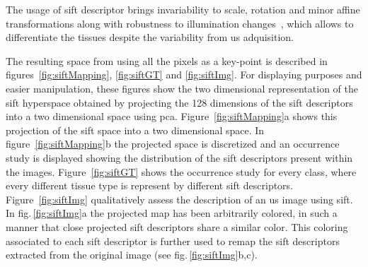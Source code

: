 \documentclass[a4paper, 10pt, conference]{llncs}      %
\begin{document}
The usage of \ac{sift} descriptor brings invariability to scale, rotation and minor affine transformations along with robustness to illumination changes~\cite{lowe2004distinctive}, which allows to differentiate the tissues despite the variability from \ac{us} adquisition.



The resulting space from using all the pixels as a key-point is described in figures~\ref{fig:siftMapping}, \ref{fig:siftGT} and \ref{fig:siftImg}. For displaying purposes and easier manipulation, these figures show the two dimensional representation of the \ac{sift} hyperspace obtained by projecting the 128 dimensions  of the \ac{sift} descriptors into a two dimensional space using \ac{pca}.
Figure~\ref{fig:siftMapping}a shows this projection of the \ac{sift} space into a two dimensional space. 
In figure~\ref{fig:siftMapping}b the projected space is discretized and an occurrence study is displayed showing the distribution of the \ac{sift} descriptors present within the images. 
Figure~\ref{fig:siftGT} shows the occurrence study for every class, where every different tissue type is represent by different \ac{sift} descriptors. 
Figure~\ref{fig:siftImg} qualitatively assess the description of an \ac{us} image using \ac{sift}. In fig.\,\ref{fig:siftImg}a the projected map has been arbitrarily colored, in such a manner that close projected \ac{sift} descriptors share a similar color. This coloring associated to each \ac{sift} descriptor is further used to remap the \ac{sift} descriptors extracted from the original image (see fig.\,\ref{fig:siftImg}b,c).
\end{document}
